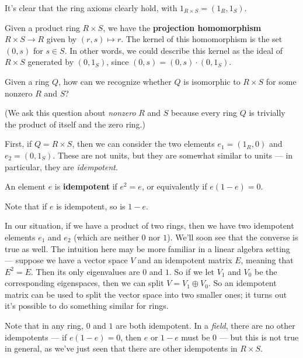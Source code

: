 It's clear that the ring axioms clearly hold, with $1_{R \times S} = (1_R, 1_S)$. 

Given a product ring $R \times S$, we have the \textbf{projection homomorphism} $R \times S \to R$ given by $(r, s) \mapsto r$. The kernel of this homomorphism is the set $(0, s)$ for $s \in S$. In other words, we could describe this kernel as the ideal of $R \times S$ generated by $(0, 1_S)$, since $(0, s) = (0, s)\cdot (0, 1_S)$. 




\begin{qq}
Given a ring $Q$, how can we recognize whether $Q$ is isomorphic to $R \times S$ for some nonzero $R$ and $S$?
\end{qq}

(We ask this question about \emph{nonzero} $R$ and $S$ because every ring $Q$ is trivially the product of itself and the zero ring.)

First, if $Q = R \times S$, then we can consider the two elements $e_1 = (1_R, 0)$ and $e_2 = (0, 1_S)$. These are not units, but they are somewhat similar to units --- in particular, they are \emph{idempotent}. 

\begin{definition}
    An element $e$ is \textbf{idempotent} if $e^2 = e$, or equivalently if $e(1 - e) = 0$. 
\end{definition}

Note that if $e$ is idempotent, so is $1 - e$. 

In our situation, if we have a product of two rings, then we have two idempotent elements $e_1$ and $e_2$ (which are neither $0$ nor $1$). We'll soon see that the converse is true as well. The intuition here may be more familiar in a linear algebra setting --- suppose we have a vector space $V$ and an idempotent matrix $E$, meaning that $E^2 = E$. Then its only eigenvalues are $0$ and $1$. So if we let $V_1$ and $V_0$ be the corresponding eigenspaces, then we can split $V = V_1 \oplus V_0$. So an idempotent matrix can be used to split the vector space into two smaller ones; it turns out it's possible to do something similar for rings.

Note that in any ring, $0$ and $1$ are both idempotent. In a \emph{field}, there are no other idempotents --- if $e(1 - e) = 0$, then $e$ or $1 - e$ must be $0$ --- but this is not true in general, as we've just seen that there are other idempotents in $R \times S$.

